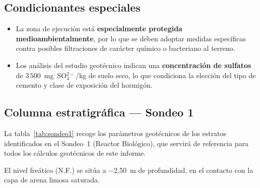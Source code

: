 \subsection{Condicionantes especiales}
\label{subsec:condicionantes}

\begin{notabox}
  \begin{itemize}
    \item La zona de ejecución está \textbf{especialmente protegida medioambientalmente},
          por lo que se deben adoptar medidas específicas contra posibles filtraciones de
          carácter químico o bacteriano al terreno.
    \item Los análisis del estudio geotécnico indican una \textbf{concentración de
          sulfatos} de $3\,500$~mg~SO$_4^{2-}$/kg de suelo seco, lo que condiciona la
          elección del tipo de cemento y clase de exposición del hormigón.
  \end{itemize}
\end{notabox}

\subsection{Columna estratigráfica — Sondeo 1}

La tabla~\ref{tab:sondeo1} recoge los parámetros geotécnicos de los estratos identificados
en el Sondeo~1 (Reactor Biológico), que servirá de referencia para todos los cálculos
geotécnicos de este informe.

\begin{table}[H]
  \centering
  \caption{Columna estratigráfica Sondeo 1}
  \label{tab:sondeo1}
\end{table}

\begin{notabox}
  El nivel freático (N.F.) se sitúa a $-$2{,}50~m de profundidad, en el contacto con
  la capa de arena limosa saturada.
\end{notabox}
